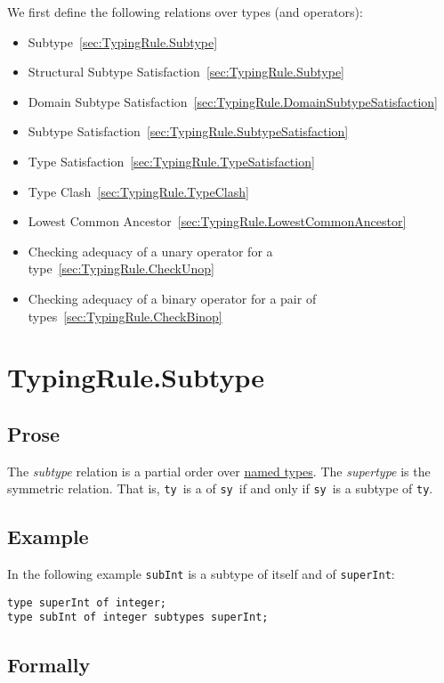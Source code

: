 \documentclass{book}
\newcommand\tty[0]{\texttt{ty}}
\newcommand\tsy[0]{\texttt{sy}}
\begin{document}
We first define the following relations over types (and operators):
\begin{itemize}
  \item Subtype~\ref{sec:TypingRule.Subtype}
  \item Structural Subtype Satisfaction~\ref{sec:TypingRule.Subtype}
  \item Domain Subtype Satisfaction~\ref{sec:TypingRule.DomainSubtypeSatisfaction}
  \item Subtype Satisfaction~\ref{sec:TypingRule.SubtypeSatisfaction}
  \item Type Satisfaction~\ref{sec:TypingRule.TypeSatisfaction}
  \item Type Clash~\ref{sec:TypingRule.TypeClash}
  \item Lowest Common Ancestor~\ref{sec:TypingRule.LowestCommonAncestor}
  \item Checking adequacy of a unary operator for a type~\ref{sec:TypingRule.CheckUnop}
  \item Checking adequacy of a binary operator for a pair of types~\ref{sec:TypingRule.CheckBinop}
\end{itemize}

\section{TypingRule.Subtype\label{sec:TypingRule.Subtype}}

  \subsection{Prose}
The \emph{subtype} relation is a partial order over \underline{named types}.
The \emph{supertype} is the symmetric relation. That is, \tty\ is a  of \tsy\ if and only if \tsy\ is a subtype of \tty.

  \subsection{Example}
In the following example \texttt{subInt} is a subtype of itself and of \texttt{superInt}:
\begin{verbatim}
type superInt of integer;
type subInt of integer subtypes superInt;
\end{verbatim}




\begin{emptyformal}
    \subsection{Formally}
\end{emptyformal}
\end{document}
